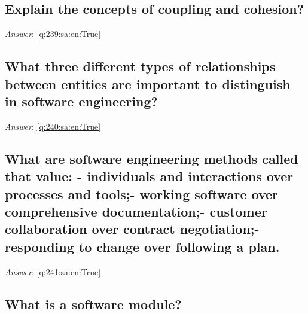 \documentclass[a4paper,11pt,oneside]{article}
\begin{document}
\begin{sloppypar}
\subsection{Explain the concepts of coupling and cohesion?}

\label{q:239:sa:en:False}

\vspace{2cm}

\noindent\makebox[\textwidth]{\hrulefill}

\vspace{1cm}

\textit{Answer}: \autoref{q:239:sa:en:True}



\subsection{What three different types of relationships between entities are important to distinguish in software engineering?}

\label{q:240:sa:en:False}

\vspace{2cm}

\noindent\makebox[\textwidth]{\hrulefill}

\vspace{1cm}

\textit{Answer}: \autoref{q:240:sa:en:True}



\subsection{What are software engineering methods called that value: - individuals and interactions over processes and tools;- working software over comprehensive documentation;- customer collaboration over contract negotiation;- responding to change over following a plan.}

\label{q:241:sa:en:False}

\vspace{2cm}

\noindent\makebox[\textwidth]{\hrulefill}

\vspace{1cm}

\textit{Answer}: \autoref{q:241:sa:en:True}



\subsection{What is a software module?}


\end{sloppypar}
\end{document}
